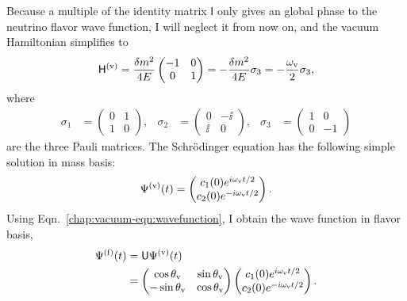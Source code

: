 Because a multiple of the identity matrix $\mathsf{I}$ only gives an global phase to the neutrino flavor wave function, I will neglect it from now on, and the vacuum Hamiltonian simplifies to
\begin{equation}
\mathsf H^{(\mathrm v)} =  \frac{\delta m^2}{4E} \begin{pmatrix}
-1 & 0 \\
0 & 1
\end{pmatrix} = -\frac{\delta m^2}{4E} \sigma_3 = -\frac{\omega_{\mathrm v}}{2}\sigma_3,
\end{equation}
where
\begin{align}
\sigma_1 &=  \begin{pmatrix}
0 & 1 \\
1 & 0
\end{pmatrix}, &\sigma_2 &=  \begin{pmatrix}
0 & -\ii \\
\ii & 0
\end{pmatrix},  &\sigma_3 &=  \begin{pmatrix}
1 & 0 \\
0 & -1
\end{pmatrix}
\end{align}
are the three Pauli matrices.
The Schr\"{o}dinger equation has the following simple solution in mass basis:
\begin{equation}
\Psi^{(\mathrm v)}(t) = \begin{pmatrix}
c_1(0) e^{i \omega_\mathrm v t/2 } \\
c_2(0) e^{ -i\omega_\mathrm v t/2 }
\end{pmatrix}.
\end{equation}
Using Eqn.~\ref{chap:vacuum-eqn:wavefunction}, I obtain the wave function in flavor basis,
\begin{align}
\Psi^{(\ff)}(t) &= \mathsf{U}\Psi^{(\vv)}(t) \\
& = \begin{pmatrix} \cos\theta_\vv & \sin \theta_\vv \\ -\sin \theta_\vv & \cos \theta_\vv \end{pmatrix} \begin{pmatrix} c_1(0) e^{i\omega_\vv t/2 } \\
c_2(0) e^{ -i\omega_\vv t/2 }    \end{pmatrix} .
\label{chap:vacuum-eqn:wavefuncion-time}
\end{align}
